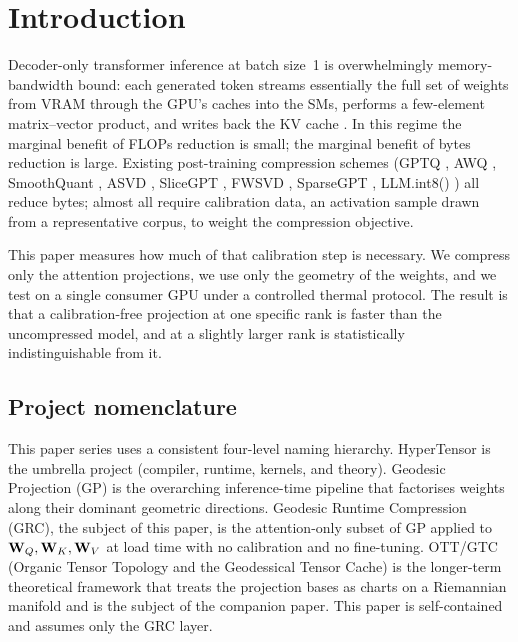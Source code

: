 \documentclass[11pt]{article}
\begin{document}
\clearpage
\tableofcontents
\clearpage

\section{Introduction}
\label{sec:intro}
Decoder-only transformer inference at batch size~1 is overwhelmingly
memory-bandwidth bound: each generated token streams essentially the
full set of weights from VRAM through the GPU's caches into the SMs, performs
a few-element matrix--vector product, and writes back the KV cache
\cite{williams2009roofline,yuan2024llmroofline}.  In this regime the marginal
benefit of FLOPs reduction is small; the marginal benefit of bytes
reduction is large.  Existing post-training compression schemes
(GPTQ \cite{frantar2022gptq}, AWQ \cite{lin2023awq}, SmoothQuant
\cite{xiao2022smoothquant}, ASVD \cite{yuan2023asvd},
SliceGPT \cite{ashkboos2024slicegpt}, FWSVD \cite{hsu2022fwsvd},
SparseGPT \cite{frantar2023sparsegpt}, LLM.int8() \cite{dettmers2022llmint8})
all reduce bytes; almost all require calibration data, an activation
sample drawn from a representative corpus, to weight the compression
objective.

This paper measures how much of that calibration step is necessary. We
compress only the attention projections, we use only the geometry of the
weights, and we test on a single consumer GPU under a controlled thermal
protocol. The result is that a calibration-free projection at one specific
rank is faster than the uncompressed model, and at a slightly larger rank
is statistically indistinguishable from it.

\subsection{Project nomenclature}
\label{sec:nomenclature}
This paper series uses a consistent four-level naming hierarchy.
HyperTensor is the umbrella project (compiler, runtime, kernels,
and theory). Geodesic Projection (GP) is the overarching
inference-time pipeline that factorises weights along their dominant
geometric directions. Geodesic Runtime Compression (GRC), the
subject of this paper, is the attention-only subset of GP applied to
$\mathbf{W}_Q,\mathbf{W}_K,\mathbf{W}_V$ at load time with no calibration and no
fine-tuning. OTT/GTC (Organic Tensor Topology and the Geodessical
Tensor Cache) is the longer-term theoretical framework that treats the
projection bases as charts on a Riemannian manifold and is the subject of
the companion paper. This paper is self-contained and assumes only the GRC
layer.
\end{document}
